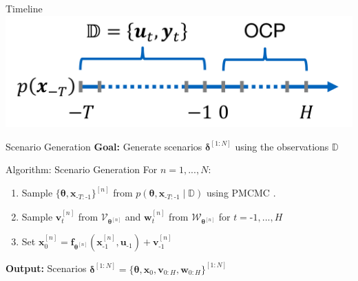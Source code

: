 \documentclass[student, noshadow, itr, english, aspectratio=169]{ITR_LSR_slides}
\begin{document}
	\appendix


\begin{frame}{\LSRITRRefTitle}
	\printbibliography
\end{frame}

\begin{frame}{Timeline}
\includegraphics[width= .9\textwidth]{Timeline_pic}
\end{frame}

\begin{frame}{Scenario Generation}
\textbf{Goal:} Generate scenarios $\boldsymbol{\delta}^{[1:N]}$ using the observations $\mathbb{D}$\\
\begin{block}{Algorithm: Scenario Generation}
For $n = 1,...,N$:
\begin{enumerate}
  \item Sample $\{ \boldsymbol{\theta}, \boldsymbol{x}_{\text{-}T:\text{-}1} \}^{[n]}$ from $p\left( \boldsymbol{\theta}, \boldsymbol{x}_{\text{-}T:\text{-}1} \mid \mathbb{D} \right)$ using PMCMC \cite{Robert_24}.
  \item Sample $\boldsymbol{v}_t^{[n]}$ from $\boldsymbol{\mathcal{V}}_{\boldsymbol{\theta}^{[n]}}$ and  $\boldsymbol{w}_t^{[n]}$ from $\boldsymbol{\mathcal{W}}_{\boldsymbol{\theta}^{[n]}}$ for $t = \text{-}1, ..., H$
  \item Set $\boldsymbol{x}_0^{[n]} = \boldsymbol{f}_{\boldsymbol{\theta}^{[n]}} \left( \boldsymbol{x}_{\text{-} 1}^{[n]}, \boldsymbol{u}_{\text{-} 1} \right) + \boldsymbol{v}_{\text{-} 1}^{[n]}$
\end{enumerate}
\textbf{Output:} Scenarios $\boldsymbol{\delta}^{[1:N]} = \{ \boldsymbol{\theta}, \boldsymbol{x}_0, \boldsymbol{v}_{0:H}, \boldsymbol{w}_{0:H}\}^{[1:N]}$
\end{block}
\end{frame}
\end{document}
